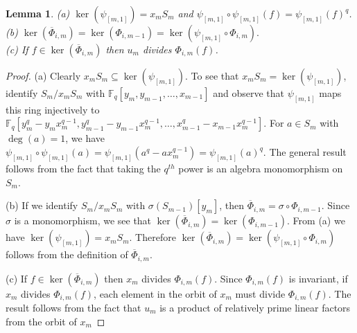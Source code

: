 \documentclass{amsart}
\newcommand{\field}{\mathbb{F}}
\newtheorem{lem}[subsection]{Lemma}
\begin{document}
\begin{lem}\label{phi_bar_lemma} (a) $\ker(\psi_{[m,1]})=x_mS_m$ and $\psi_{[m,1]}\circ\psi_{[m,1]}(f)=\psi_{[m,1]}(f)^q$.\\
(b) $\ker(\overline{\Phi}_{i,m})=
\ker(\Phi_{i,m-1})=\ker(\psi_{[m,1]}\circ\Phi_{i,m}).$\\
(c) If $f\in\ker(\overline{\Phi}_{i,m})$ then $u_m$ divides  $\Phi_{i,m}(f)$.
\end{lem}
\begin{proof} (a) Clearly $x_m S_m\subseteq \ker(\psi_{[m,1]})$. 
To see that $x_mS_m=\ker(\psi_{[m,1]})$, identify $S_m/x_mS_m$ with $\field_q[y_m,y_{m-1},\ldots, x_{m-1}]$ and observe that $\psi_{[m,1]}$ maps this ring
injectively to $\field_q[y_m^q-y_mx_m^{q-1},y_{m-1}^q-y_{m-1}x_m^{q-1},\ldots, x_{m-1}^q-x_{m-1}x_m^{q-1}]$.
For $a\in S_m$ with $\deg(a)=1$, we have $\psi_{[m,1]}\circ\psi_{[m,1]}(a)=\psi_{[m,1]}(a^q-ax_m^{q-1})=\psi_{[m,1]}(a)^q$. 
The general result follows from the fact that taking the $q^{th}$ power is an algebra monomorphism on $S_m$.

(b) If we identify $S_m/x_mS_m$ with $\sigma(S_{m-1})[y_m]$, then $\overline{\Phi}_{i,m}=\sigma\circ\Phi_{i,m-1}$. 
Since $\sigma$ is a monomorphism, we see that $\ker(\overline{\Phi}_{i,m})=\ker(\Phi_{i,m-1})$.
From (a) we have $\ker(\psi_{[m,1]})=x_mS_m$. Therefore $\ker(\overline{\Phi}_{i,m})=\ker(\psi_{[m,1]}\circ\Phi_{i,m})$ follows from the definition of $\overline{\Phi}_{i,m}$.  

(c) If $f\in\ker(\overline{\Phi}_{i,m})$ then $x_m$ divides $\Phi_{i,m}(f)$. Since $\Phi_{i,m}(f)$ is invariant, 
if $x_m$ divides $\Phi_{i,m}(f)$,
each element in the orbit of $x_m$ must divide $\Phi_{i,m}(f)$. The result follows from the fact that $u_m$ is a product of relatively prime linear factors from the orbit of $x_m$ 
\end{proof}
\end{document}
